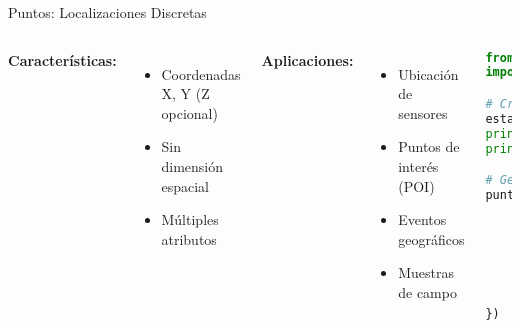 \documentclass[10pt]{beamer}
\begin{document}
\begin{frame}[fragile]{Puntos: Localizaciones Discretas}
    \begin{columns}
        \textbf{Características:}
        \begin{itemize}
            \item Coordenadas X, Y (Z opcional)
            \item Sin dimensión espacial
            \item Múltiples atributos
        \end{itemize}
        
        \textbf{Aplicaciones:}
        \begin{itemize}
            \item Ubicación de sensores
            \item Puntos de interés (POI)
            \item Eventos geográficos
            \item Muestras de campo
        \end{itemize}
        
        \begin{lstlisting}[language=Python, caption=Trabajando con puntos]
from shapely.geometry import Point
import geopandas as gpd

# Crear punto
estacion = Point(-70.651, -33.438)
print(f"X: {estacion.x}")
print(f"Y: {estacion.y}")

# GeoDataFrame con puntos
puntos = gpd.GeoDataFrame({
    'id': [1, 2, 3],
    'tipo': ['sensor', 'muestra', 'POI'],
    'geometry': [
        Point(-70.651, -33.438),
        Point(-70.649, -33.437),
        Point(-70.652, -33.439)
    ]
})
        \end{lstlisting}
    \end{columns}
\end{frame}
\end{document}
